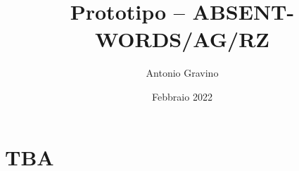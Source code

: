 \documentclass{article}
\title{Prototipo -- ABSENT-WORDS/AG/RZ}
\author{Antonio Gravino}
\date{Febbraio 2022}
\begin{document}
\maketitle

\section{TBA}
\end{document}
